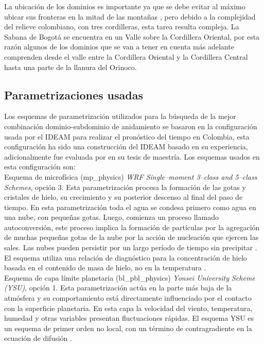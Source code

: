 La ubicación de los dominios es importante ya que se debe evitar al máximo ubicar sus fronteras en la mitad de las montañas \citep{Skamarock2008}, pero debido a la complejidad del relieve colombiano, con tres cordilleras, esta tarea resulta compleja. La Sabana de Bogotá se encuentra en un Valle sobre la Cordillera Oriental, por esta razón algunos de los dominios que se van a tener en cuenta más adelante comprenden desde el valle entre la Cordillera Oriental y la Cordillera Central hasta una parte de la llanura del Orinoco.\\




\subsection{Parametrizaciones usadas}

Los esquemas de parametrización utilizados para la búsqueda de la mejor combinación dominio-subdominio de anidamiento se basaron en la configuración usada por el IDEAM para realizar el pronóstico del tiempo en Colombia, esta configuración ha sido una construcción del IDEAM basado en su experiencia, adicionalmente fue evaluada por \citet{ArmentaPorras2013} en su tesis de maestría. Los esquemas usados en esta configuración son:\\


Esquema de microfísica (mp\_physics) \textit{WRF Single–moment 3–class and 5–class Schemes}, opción 3. Esta parametrización procesa la formación de las gotas y cristales de hielo, su crecimiento y su posterior descenso al final del paso de tiempo. En esta parametrización toda el agua se condesa primero como agua en una nube, con pequeñas gotas. Luego, comienza un proceso llamado autoconversión, este proceso implica la formación de partículas por la agregación de muchas pequeñas gotas de la nube por la acción de nucleación que ejercen las sales. Las nubes pueden persistir por un largo período de tiempo sin precipitar \citep{Ghosh1998}. El esquema utiliza una relación de diagnóstico para la concentración de hielo basada en el contenido de masa de hielo, no en la temperatura \citep{ArmentaPorras2013}.\\

Esquema de capa límite planetaria (bl\_pbl\_physics) \textit{Yonsei University Scheme (YSU)}, opción 1. Esta parametrización actúa en la parte más baja de la atmósfera y su comportamiento está directamente influenciado por el contacto con la superficie planetaria. En esta capa la velocidad del viento, temperatura, humedad y otras variables presentan fluctuaciones rápidas. El esquema YSU es un esquema de primer orden no local, con un término de contragradiente en la ecuación de difusión \citep{Hu2010}.\\

